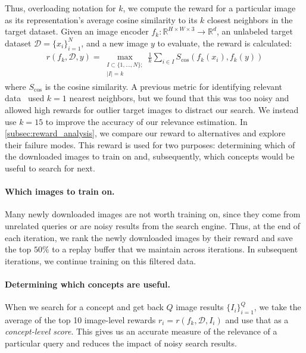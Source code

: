 Thus, overloading notation for $k$, we compute the reward for a particular image as its representation's average cosine similarity to its $k$ closest neighbors in the target dataset. Given an image encoder $f_k: \mathbb{R}^{H\times W\times 3} \rightarrow \mathbb{R}^d$, an unlabeled target dataset $\mathcal D = \{ x_i \}_{i=1}^N$, and a new image $y$ to evaluate, the reward is calculated:
\begin{align}
    r(f_k, \mathcal D, y) =
        \max_{\substack{I \subset \{1, \ldots, N\}; \\ |I| = k}}
        \frac{1}{k} \sum_{i \in I} S_{\cos}\left(f_k(x_i), f_k(y)\right)
\end{align}
where $S_{\cos}$ is the cosine similarity. A previous metric for identifying relevant data~\cite{jiang2021improving} used $k=1$ nearest neighbors, 
but we found that this was too noisy and allowed high rewards for outlier target images to distract our search.
We instead use $k=15$ to improve the accuracy of our relevance estimation.
In \cref{subsec:reward_analysis}, we compare our reward to alternatives and explore their failure modes. This reward is used for two purposes: determining which of the downloaded images to train on and, subsequently, which concepts would be useful to search for next.

\vspace{-0.06in}
\paragraph{Which images to train on.}
Many newly downloaded images are not worth training on, since they come from unrelated queries or are noisy results from the search engine.
Thus, at the end of each iteration, we rank the newly downloaded images by their reward and save the top $50\%$ to a replay buffer that we maintain across iterations. In subsequent iterations, we continue training on this filtered data.

\vspace{-0.06in}
\paragraph{Determining which concepts are useful.}
When we search for a concept and get back $Q$ image results $\{ I_i \}_{i=1}^Q$, we take the average of the top 10 image-level rewards $r_i = r(f_k, \mathcal D, I_i)$ and use that as a \textit{concept-level score}. This gives us an accurate measure of the relevance of a particular query and reduces the impact of noisy search results. 



